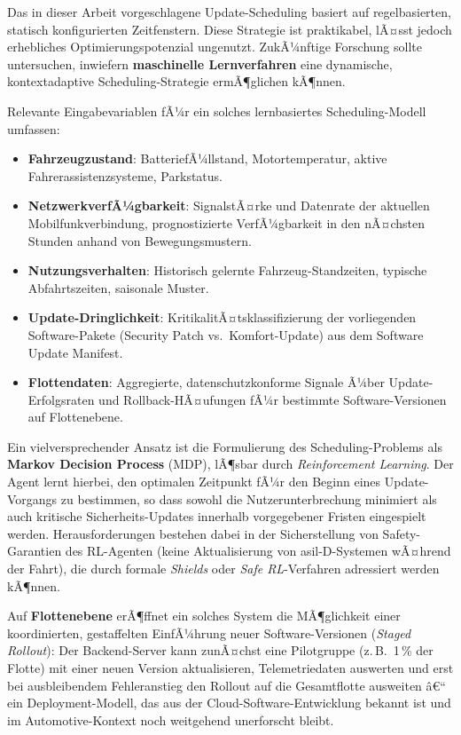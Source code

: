 ﻿\documentclass[12pt,a4paper,twoside]{article}
\begin{document}
Das in dieser Arbeit vorgeschlagene Update-Scheduling basiert auf
regelbasierten, statisch konfigurierten Zeitfenstern. Diese Strategie
ist praktikabel, lÃ¤sst jedoch erhebliches Optimierungspotenzial
ungenutzt. ZukÃ¼nftige Forschung sollte untersuchen, inwiefern
\textbf{maschinelle Lernverfahren} eine dynamische, kontextadaptive
Scheduling-Strategie ermÃ¶glichen kÃ¶nnen.

Relevante Eingabevariablen fÃ¼r ein solches lernbasiertes Scheduling-Modell
umfassen:

\begin{itemize}
  \item \textbf{Fahrzeugzustand}: BatteriefÃ¼llstand,
    Motortemperatur, aktive Fahrerassistenzsysteme, Parkstatus.
  \item \textbf{NetzwerkverfÃ¼gbarkeit}: SignalstÃ¤rke und
    Datenrate der aktuellen Mobilfunkverbindung, prognostizierte
    VerfÃ¼gbarkeit in den nÃ¤chsten Stunden anhand von Bewegungsmustern.
  \item \textbf{Nutzungsverhalten}: Historisch gelernte
    Fahrzeug-Standzeiten, typische Abfahrtszeiten, saisonale
    Muster.
  \item \textbf{Update-Dringlichkeit}: KritikalitÃ¤tsklassifizierung
    der vorliegenden Software-Pakete (Security Patch vs.\ Komfort-Update)
    aus dem Software Update Manifest.
  \item \textbf{Flottendaten}: Aggregierte, datenschutzkonforme
    Signale Ã¼ber Update-Erfolgsraten und Rollback-HÃ¤ufungen fÃ¼r
    bestimmte Software-Versionen auf Flottenebene.
\end{itemize}

Ein vielversprechender Ansatz ist die Formulierung des Scheduling-Problems
als \textbf{Markov Decision Process} (MDP), lÃ¶sbar durch
\textit{Reinforcement Learning}. Der Agent lernt hierbei, den optimalen
Zeitpunkt fÃ¼r den Beginn eines Update-Vorgangs zu bestimmen, so dass
sowohl die Nutzerunterbrechung minimiert als auch kritische
Sicherheits-Updates innerhalb vorgegebener Fristen eingespielt werden.
Herausforderungen bestehen dabei in der Sicherstellung von
Safety-Garantien des RL-Agenten (keine Aktualisierung von
\gls{asil}-D-Systemen wÃ¤hrend der Fahrt), die durch formale
\textit{Shields} oder \textit{Safe RL}-Verfahren adressiert werden kÃ¶nnen.

Auf \textbf{Flottenebene} erÃ¶ffnet ein solches System die MÃ¶glichkeit
einer koordinierten, gestaffelten EinfÃ¼hrung neuer Software-Versionen
(\textit{Staged Rollout}): Der Backend-Server kann zunÃ¤chst eine
Pilotgruppe (z.\,B.\ 1\,\% der Flotte) mit einer neuen Version
aktualisieren, Telemetriedaten auswerten und erst bei ausbleibendem
Fehleranstieg den Rollout auf die Gesamtflotte ausweiten â€“ ein
Deployment-Modell, das aus der Cloud-Software-Entwicklung bekannt ist
und im Automotive-Kontext noch weitgehend unerforscht bleibt.
\end{document}
